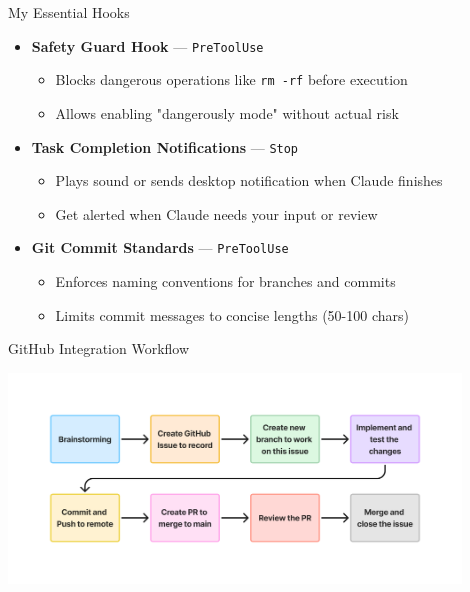 \documentclass[aspectratio=169]{beamer}
\begin{document}
\begin{frame}{My Essential Hooks}

\vspace{0.3cm}

\begin{itemize}
\setlength{\itemsep}{0.5cm}

\item \textbf{Safety Guard Hook} — \texttt{PreToolUse}
\begin{itemize}
\item Blocks dangerous operations like \texttt{rm -rf} before execution
\item Allows enabling "dangerously mode" without actual risk
\end{itemize}

\item \textbf{Task Completion Notifications} — \texttt{Stop}
\begin{itemize}
\item Plays sound or sends desktop notification when Claude finishes
\item Get alerted when Claude needs your input or review
\end{itemize}

\item \textbf{Git Commit Standards} — \texttt{PreToolUse}
\begin{itemize}
\item Enforces naming conventions for branches and commits
\item Limits commit messages to concise lengths (50-100 chars)
\end{itemize}

\end{itemize}

\vspace{0.4cm}

\end{frame}

\begin{frame}{GitHub Integration Workflow}

\vspace{0.5cm}
\centering
\includegraphics[width=0.9\textwidth]{figures/fig_git_workflow.png}

\end{frame}
\end{document}
